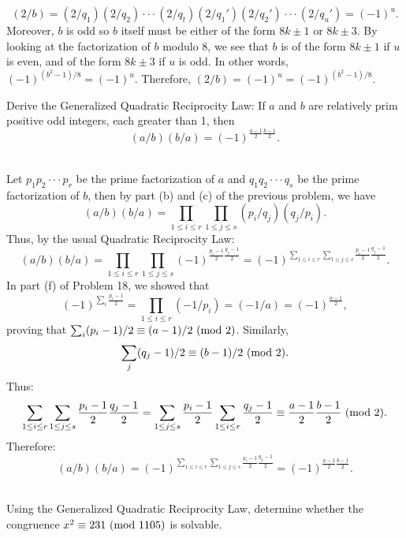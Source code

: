 \begin{solution}
\begin{enumerate}
        $$(2/b) = (2/q_1)(2/q_2)\cdot \cdot \cdot (2/q_t)(2/q_1')(2/q_2')\cdot \cdot \cdot (2/q_u') = (-1)^u.$$
        Moreover, $b$ is odd so $b$ itself must be either of the form $8k\pm 1$ or $8k\pm 3$. By looking at the factorization of $b$ modulo 8, we see that $b$ is of the form $8k\pm 1$ if $u$ is even, and of the form $8k\pm 3$ if $u$ is odd. In other words, $(-1)^{(b^2-1)/8} = (-1)^u$. Therefore, $(2/b) = (-1)^{u} = (-1)^{(b^2-1)/8}$. \\
    \end{enumerate}
\end{solution}

\begin{exercise}
    Derive the Generalized Quadratic Reciprocity Law: If $a$ and $b$ are relatively prim positive odd integers, each greater than 1, then
    $$(a/b)(b/a) = (-1)^{\frac{a-1}{2}\frac{b-1}{2}}.$$
     \\
\end{exercise}

\begin{solution}
    Let $p_1p_2\cdot \cdot \cdot p_r$ be the prime factorization of $a$ and $q_1q_2 \cdot \cdot \cdot q_s$ be the prime factorization of $b$, then by part (b) and (c) of the previous problem, we have
    $$(a/b)(b/a) = \prod_{1\leq i \leq r}\prod_{1 \leq j \leq s}(p_i/q_j)(q_j/p_i).$$
    Thus, by the usual Quadratic Reciprocity Law:
    $$(a/b)(b/a) = \prod_{1\leq i \leq r}\prod_{1 \leq j \leq s}(-1)^{\frac{p_i - 1}{2}\frac{q_j - 1}{2}} = (-1)^{\sum_{1\leq i \leq r}\sum_{1 \leq j \leq s}\frac{p_i - 1}{2}\frac{q_j - 1}{2}}.$$
    In part (f) of Problem 18, we showed that
    $$(-1)^{\sum_i \frac{p_i - 1}{2}} = \prod_{1\leq i \leq r}(-1/p_i) = (-1/a) = (-1)^{\frac{a-1}{2}},$$
    proving that $\sum_i (p_i - 1)/2 \equiv (a-1)/2 \ (\mathrm{mod}\ 2)$. Similarly, $$\sum_j (q_j - 1)/2 \equiv (b-1)/2 \ (\mathrm{mod}\ 2).$$
    Thus:
    $$\sum_{1\leq i \leq r}\sum_{1 \leq j \leq s}\frac{p_i - 1}{2}\frac{q_j - 1}{2} = \sum_{1 \leq j \leq s}\frac{p_i - 1}{2}\sum_{1\leq i \leq r}\frac{q_j - 1}{2} \equiv \frac{a-1}{2}\frac{b-1}{2} \ (\mathrm{mod}\ 2).$$
    Therefore:
    $$(a/b)(b/a) = (-1)^{\sum_{1\leq i \leq r}\sum_{1 \leq j \leq s}\frac{p_i - 1}{2}\frac{q_j - 1}{2}} = (-1)^{\frac{a-1}{2}\frac{b-1}{2}}.$$\\
\end{solution}

\begin{exercise}
    Using the Generalized Quadratic Reciprocity Law, determine whether the congruence $x^2 \equiv 231 \ (\mathrm{mod}\ 1105)$ is solvable. \\
\end{exercise}

